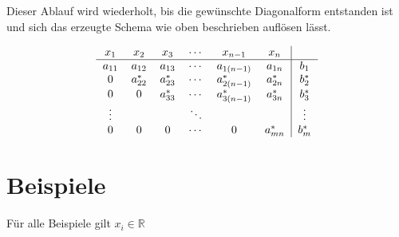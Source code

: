 			\noindent Dieser Ablauf wird wiederholt, bis die gew\"unschte Diagonalform entstanden ist
			und sich das erzeugte Schema wie oben beschrieben aufl\"osen l\"asst.
			
			\[
				\begin{tabular} {cccccc|c}
					$x_1$ & $x_2$ & $x_3$ & $\cdots$ & $x_{n-1}$ & $x_n$ &\\
					\hline
					$a_{11}$ & $a_{12}$ & $a_{13}$ & $\cdots$ & $a_{1(n-1)}$ & $a_{1n}$ & $b_{1}$\\
					0 & $a_{22}^*$ & $a_{23}^*$ & $\cdots$ & $a_{2(n-1)}^*$ & $a_{2n}^*$ & $b_{2}^*$\\
					0 & 0 & $a_{33}^*$ & $\cdots$ & $a_{3(n-1)}^*$ & $a_{3n}^*$ & $b_{3}^*$\\
					$\vdots$ & & & $\ddots$ & & & $\vdots$\\
					0 & 0 & 0 & $\cdots$ & 0 & $a_{mn}^*$ & $b_{m}^*$\\
				\end{tabular}
			\]
				
	\section{Beispiele}
	
		F\"ur alle Beispiele gilt $ x_i \in \mathbb{R} $ 
		
